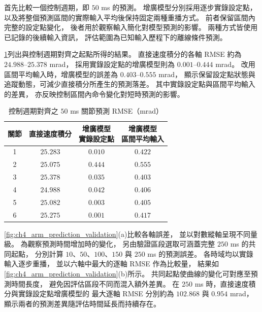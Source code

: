 首先比較一個控制週期，即 $50$ ms 的預測。
增廣模型分別採用逐步實錄設定點，
以及將整個預測區間的實際輸入平均後保持固定兩種重播方式。
前者保留區間內完整的設定點變化，
後者用於觀察輸入簡化對模型預測的影響。
兩種方式皆使用已記錄的後續輸入資訊，
評估範圍為已知輸入歷程下的離線條件預測。

\cref{tab:ch4_arm_prediction_rmse}列出與控制週期對齊之起點所得的結果。
直接速度積分的各軸 RMSE 約為 $24.988$--$25.378$ mrad，
採用實錄設定點的增廣模型則為 $0.001$--$0.444$ mrad。
改用區間平均輸入時，增廣模型的誤差為 $0.403$--$0.555$ mrad，
顯示保留設定點狀態與追蹤動態，可減少直接積分所產生的預測落差。
其中實錄設定點與區間平均輸入的差異，
亦反映控制區間內命令變化對短時預測的影響。

\begin{table}[htbp]
    \centering
    \caption{控制週期對齊之 $50$ ms 關節預測 RMSE（mrad）}
    \label{tab:ch4_arm_prediction_rmse}
    \begingroup
    \small
    \renewcommand{\arraystretch}{1.25}
    \begin{tabular}{c c c c}
        \hline
        關節 & 直接速度積分
        & \shortstack{增廣模型\\實錄設定點}
        & \shortstack{增廣模型\\區間平均輸入} \\
        \hline
        1 & $25.283$ & $0.010$ & $0.422$ \\
        2 & $25.075$ & $0.444$ & $0.555$ \\
        3 & $25.378$ & $0.035$ & $0.403$ \\
        4 & $24.988$ & $0.042$ & $0.406$ \\
        5 & $25.082$ & $0.003$ & $0.405$ \\
        6 & $25.275$ & $0.001$ & $0.417$ \\
        \hline
    \end{tabular}
    \endgroup
\end{table}

\cref{fig:ch4_arm_prediction_validation}(a)比較各軸誤差，
並以對數縱軸呈現不同量級。
為觀察預測時間增加時的變化，
另由驗證區段選取可涵蓋完整 $250$ ms 的共同起點，
分別計算 $10$、$50$、$100$、$150$ 與 $250$ ms 的預測誤差。
各時域均以實錄輸入逐步重播，
並以六軸中最大的逐軸 RMSE 作為比較量，
結果如\cref{fig:ch4_arm_prediction_validation}(b)所示。
共同起點使曲線的變化可對應至預測時間長度，
避免因評估區段不同而混入額外差異。
在 $250$ ms 時，直接速度積分與實錄設定點增廣模型的
最大逐軸 RMSE 分別約為 $102.868$ 與 $0.954$ mrad，
顯示兩者的預測差異隨評估時間延長而持續存在。

